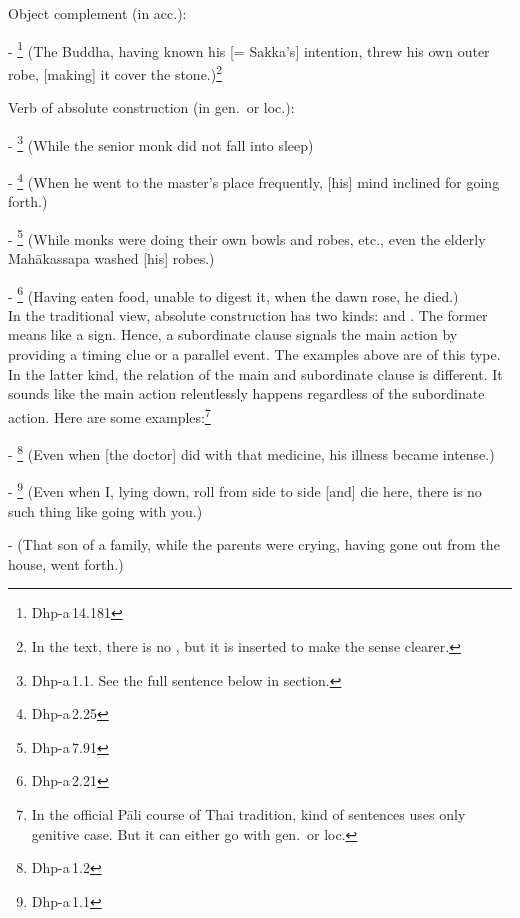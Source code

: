 \begin{compactenum}[(1)]
\item Object complement (in acc.):\par
- \footnote{Dhp-a\,14.181} (The Buddha, having known his [= Sakka's] intention, threw his own outer robe, [making] it cover the stone.)\footnote{In the text, there is no , but it is inserted to make the sense clearer.}\par

\item Verb of absolute construction (in gen.\ or loc.):\par
- \footnote{Dhp-a\,1.1. See the full sentence below in  section.} (While the senior monk did not fall into sleep)\par
- \footnote{Dhp-a\,2.25} (When he went to the master's place frequently, [his] mind inclined for going forth.)\par
- \footnote{Dhp-a\,7.91} (While monks were doing their own bowls and robes, etc., even the elderly Mah\=akassapa washed [his] robes.)\par
- \footnote{Dhp-a\,2.21} (Having eaten food, unable to digest it, when the dawn rose, he died.)\\[1.5mm]
In the traditional view, absolute construction has two kinds:  and . The former means like a sign. Hence, a subordinate clause signals the main action by providing a timing clue or a parallel event. The examples above are of this type. In the latter kind, the relation of the main and subordinate clause is different. It sounds like the main action relentlessly happens regardless of the subordinate action. Here are some examples:\footnote{In the official P\=ali course of Thai tradition,  kind of sentences uses only genitive case. But it can either go with gen.\ or loc.}\par
- \footnote{Dhp-a\,1.2} (Even when [the doctor] did with that medicine, his illness became intense.)\par
- \footnote{Dhp-a\,1.1} (Even when I, lying down, roll from side to side [and] die here, there is no such thing like going with you.)\par
-  (That son of a family, while the parents were crying, having gone out from the house, went forth.)\par
\end{compactenum}

